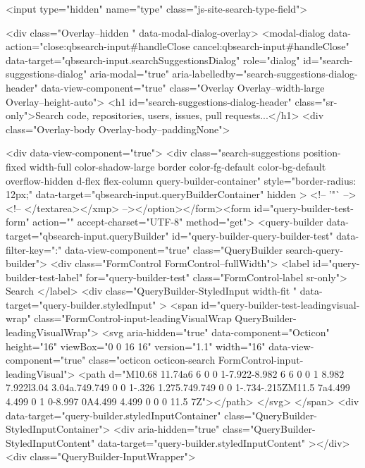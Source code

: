     <input type="hidden" name="type" class="js-site-search-type-field">

    
<div class="Overlay--hidden " data-modal-dialog-overlay>
  <modal-dialog data-action="close:qbsearch-input#handleClose cancel:qbsearch-input#handleClose" data-target="qbsearch-input.searchSuggestionsDialog" role="dialog" id="search-suggestions-dialog" aria-modal="true" aria-labelledby="search-suggestions-dialog-header" data-view-component="true" class="Overlay Overlay--width-large Overlay--height-auto">
      <h1 id="search-suggestions-dialog-header" class="sr-only">Search code, repositories, users, issues, pull requests...</h1>
    <div class="Overlay-body Overlay-body--paddingNone">
      
          <div data-view-component="true">        <div class="search-suggestions position-fixed width-full color-shadow-large border color-fg-default color-bg-default overflow-hidden d-flex flex-column query-builder-container"
          style="border-radius: 12px;"
          data-target="qbsearch-input.queryBuilderContainer"
          hidden
        >
          <!-- '"` --><!-- </textarea></xmp> --></option></form><form id="query-builder-test-form" action="" accept-charset="UTF-8" method="get">
  <query-builder data-target="qbsearch-input.queryBuilder" id="query-builder-query-builder-test" data-filter-key=":" data-view-component="true" class="QueryBuilder search-query-builder">
    <div class="FormControl FormControl--fullWidth">
      <label id="query-builder-test-label" for="query-builder-test" class="FormControl-label sr-only">
        Search
      </label>
      <div
        class="QueryBuilder-StyledInput width-fit "
        data-target="query-builder.styledInput"
      >
          <span id="query-builder-test-leadingvisual-wrap" class="FormControl-input-leadingVisualWrap QueryBuilder-leadingVisualWrap">
            <svg aria-hidden="true" data-component="Octicon" height="16" viewBox="0 0 16 16" version="1.1" width="16" data-view-component="true" class="octicon octicon-search FormControl-input-leadingVisual">
    <path d="M10.68 11.74a6 6 0 0 1-7.922-8.982 6 6 0 0 1 8.982 7.922l3.04 3.04a.749.749 0 0 1-.326 1.275.749.749 0 0 1-.734-.215ZM11.5 7a4.499 4.499 0 1 0-8.997 0A4.499 4.499 0 0 0 11.5 7Z"></path>
</svg>
          </span>
        <div data-target="query-builder.styledInputContainer" class="QueryBuilder-StyledInputContainer">
          <div
            aria-hidden="true"
            class="QueryBuilder-StyledInputContent"
            data-target="query-builder.styledInputContent"
          ></div>
          <div class="QueryBuilder-InputWrapper">
